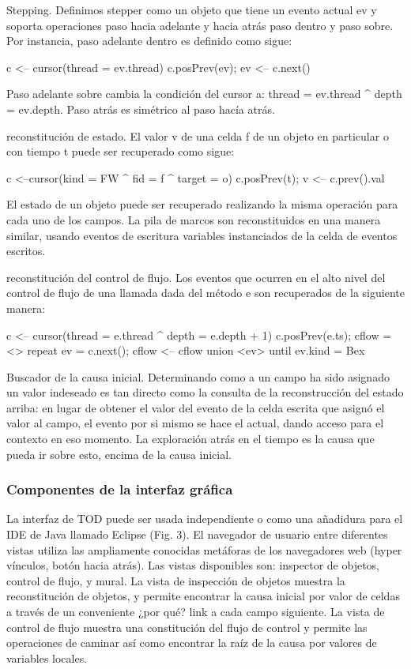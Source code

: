 \documentclass[12pt,a4paper]{report}
\begin{document}
Stepping.  Definimos stepper como un objeto que tiene un evento actual ev y soporta operaciones paso hacia adelante y hacia atrás paso dentro y paso sobre.  Por instancia, paso adelante dentro es definido como sigue:

	c <-- cursor(thread = ev.thread)
	c.posPrev(ev); ev <-- c.next()

	Paso adelante sobre cambia la condición del cursor a: thread = ev.thread ^ depth = ev.depth.  Paso atrás es simétrico al paso hacía atrás.

reconstitución de estado.  El valor v de una celda f de un objeto en particular o con tiempo t puede ser recuperado como sigue:

	c <--cursor(kind = FW ^ fid = f ^ target = o)
	c.posPrev(t); v <-- c.prev().val

El estado de un objeto puede ser recuperado realizando la misma operación para cada uno de los campos.  La pila de marcos son reconstituidos en una manera similar, usando eventos de escritura variables instanciados de la celda de eventos escritos.

reconstitución del control de flujo.  Los eventos que ocurren en el alto nivel del control de flujo de una llamada dada del método e  son recuperados de la siguiente manera:

	c <-- cursor(thread = e.thread ^ depth = e.depth + 1)
	c.posPrev(e.ts); cflow = <>
	repeat
		ev = c.next(); cflow <-- cflow union <ev>
	until ev.kind = Bex

Buscador de la causa inicial.  Determinando como a un campo ha sido asignado un valor indeseado es tan directo como la consulta de la reconstrucción del estado arriba:  en lugar de obtener el valor del evento de la celda escrita que asignó el valor al campo, el evento por si mismo se hace el actual, dando acceso para el contexto en eso momento.  La exploración atrás en el tiempo es la causa que pueda ir sobre esto, encima de la causa inicial.

			\subsubsection{Componentes de la interfaz gráfica}

	La interfaz de TOD puede ser usada independiente o como una añadidura para el IDE de Java llamado Eclipse (Fig. 3).  El navegador de usuario entre diferentes vistas utiliza las ampliamente conocidas metáforas de los navegadores web (hyper vínculos, botón hacia atrás).  Las vistas disponibles son:  inspector de objetos, control de flujo, y mural.  La vista de inspección de objetos muestra la reconstitución de objetos, y permite encontrar la causa inicial por valor de celdas a través de un conveniente ¿por qué? link a cada campo siguiente. La vista de control de flujo muestra una constitución del flujo de control y permite las operaciones de caminar así como encontrar la raíz de la causa por valores de variables locales.
\end{document}
